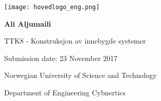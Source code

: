 \begin{titlepage}

	
	\texttt{[image: hovedlogo\_eng.png]}
	
	
	\vspace{2.5 cm}
		
		
		
		
		\Huge
		
		
		\LARGE		
		\vspace{3cm}
			
			
		\textbf{Ali Aljumaili}		
		
		\huge
		
		\vspace{0.5cm}
		\LARGE %
		
		
		\vspace{5 cm}
		
	
	TTK8 - Konstruksjon av innebygde systemer
	
	Submission date: 23 November 2017


	
	\vfill
		
	Norwegian University of Science and Technology
	
	Department of Engineering Cybnertics	
		
	


\end{titlepage}
